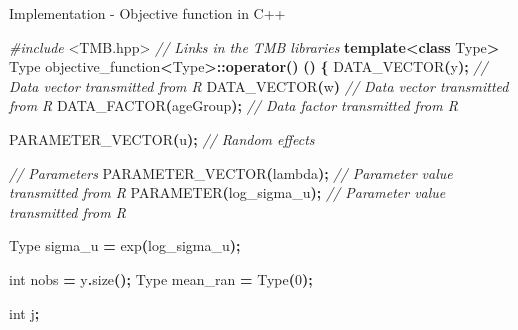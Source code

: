 \documentclass[aspectratio=169]{beamer}
\newenvironment{Shaded}{\begin{snugshade}}{\end{snugshade}}
\newcommand{\CommentTok}[1]{\textcolor[rgb]{0.56,0.35,0.01}{\textit{#1}}}
\newcommand{\DataTypeTok}[1]{\textcolor[rgb]{0.13,0.29,0.53}{#1}}
\newcommand{\DecValTok}[1]{\textcolor[rgb]{0.00,0.00,0.81}{#1}}
\newcommand{\ImportTok}[1]{#1}
\newcommand{\KeywordTok}[1]{\textcolor[rgb]{0.13,0.29,0.53}{\textbf{#1}}}
\newcommand{\NormalTok}[1]{#1}
\newcommand{\OperatorTok}[1]{\textcolor[rgb]{0.81,0.36,0.00}{\textbf{#1}}}
\newcommand{\PreprocessorTok}[1]{\textcolor[rgb]{0.56,0.35,0.01}{\textit{#1}}}
\begin{document}
\begin{frame}[fragile]{Implementation - Objective function in C++}
\protect\hypertarget{implementation---objective-function-in-c}{}
\tiny

\begin{Shaded}
\begin{Highlighting}[]
\PreprocessorTok{\#include }\ImportTok{\textless{}TMB.hpp\textgreater{}}\PreprocessorTok{              }\CommentTok{// Links in the TMB libraries}
\KeywordTok{template}\OperatorTok{\textless{}}\KeywordTok{class}\NormalTok{ Type}\OperatorTok{\textgreater{}}
\NormalTok{Type objective\_function}\OperatorTok{\textless{}}\NormalTok{Type}\OperatorTok{\textgreater{}::}\KeywordTok{operator}\OperatorTok{()} \OperatorTok{()}
\OperatorTok{\{}
\NormalTok{  DATA\_VECTOR}\OperatorTok{(}\NormalTok{y}\OperatorTok{);}                       \CommentTok{// Data vector transmitted from R}
\NormalTok{  DATA\_VECTOR}\OperatorTok{(}\NormalTok{w}\OperatorTok{)}                \CommentTok{// Data vector transmitted from R}
\NormalTok{  DATA\_FACTOR}\OperatorTok{(}\NormalTok{ageGroup}\OperatorTok{);}        \CommentTok{// Data factor transmitted from R}

\NormalTok{  PARAMETER\_VECTOR}\OperatorTok{(}\NormalTok{u}\OperatorTok{);}              \CommentTok{// Random effects}
   
  \CommentTok{// Parameters}
\NormalTok{  PARAMETER\_VECTOR}\OperatorTok{(}\NormalTok{lambda}\OperatorTok{);}       \CommentTok{// Parameter value transmitted from R}
\NormalTok{  PARAMETER}\OperatorTok{(}\NormalTok{log\_sigma\_u}\OperatorTok{);}               \CommentTok{// Parameter value transmitted from R}
  
\NormalTok{  Type sigma\_u }\OperatorTok{=}\NormalTok{ exp}\OperatorTok{(}\NormalTok{log\_sigma\_u}\OperatorTok{);}

  \DataTypeTok{int}\NormalTok{ nobs }\OperatorTok{=}\NormalTok{ y}\OperatorTok{.}\NormalTok{size}\OperatorTok{();}
\NormalTok{  Type mean\_ran }\OperatorTok{=}\NormalTok{ Type}\OperatorTok{(}\DecValTok{0}\OperatorTok{);}
  
  \DataTypeTok{int}\NormalTok{ j}\OperatorTok{;}


\end{Highlighting}
\end{Shaded}
\end{frame}
\end{document}
